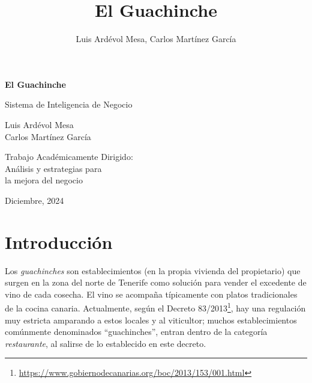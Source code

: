 \documentclass[12pt]{opticajnl}
\title{El Guachinche}
\author[1,2,3]{Luis Ardévol Mesa, Carlos Martínez García}
\begin{document}
\begin{titlepage}
\begin{center}
    \vspace*{5cm}
    
    {\huge\bfseries El Guachinche\par}
    \vspace{1cm}
    
    {\Large\color{crimson} Sistema de Inteligencia de Negocio\par}
    \vspace{1cm}
    
    
    \vspace{1.5cm}
    {\large Luis Ardévol Mesa\\
    Carlos Martínez García\par}
    
    \vfill
    
    {\large Trabajo Académicamente Dirigido:
    \\Análisis y estrategias para\\
    la mejora del negocio\par}
    
    \vspace{2cm}
    
    {\large Diciembre, 2024\par}
\end{center}
\end{titlepage}

\maketitle

\section{Introducción}


Los \textit{guachinches} son establecimientos (en la propia vivienda del propietario) que surgen en la zona del norte de Tenerife como solución para vender el excedente de vino de cada cosecha. El vino se acompaña típicamente con platos tradicionales de la cocina canaria. Actualmente, según el Decreto 83/2013\footnote{\url{https://www.gobiernodecanarias.org/boc/2013/153/001.html}}, hay una regulación muy estricta amparando a estos locales y al viticultor; muchos establecimientos comúnmente denominados ``guachinches'', entran dentro de la categoría \textit{restaurante}, al salirse de lo establecido en este decreto. \\
\end{document}
